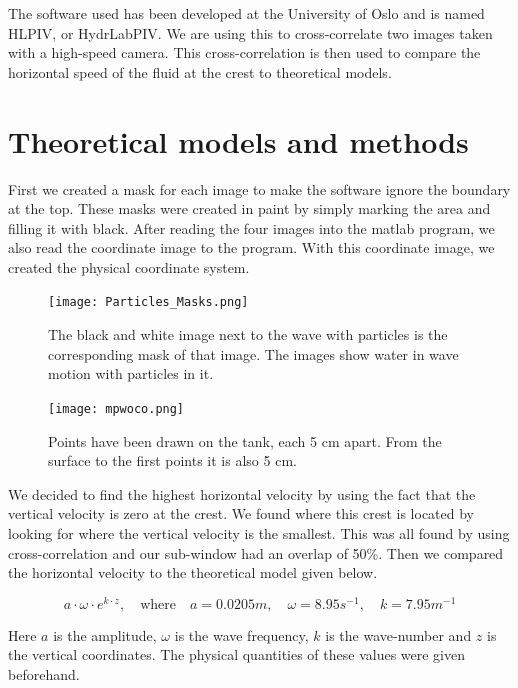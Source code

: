 \documentclass[english,a4paper,12pt]{article}
\begin{document}
The software used has been developed at the University of Oslo and is named HLPIV, or HydrLabPIV. We are using this to cross-correlate two images taken with a high-speed camera. This cross-correlation is then used to compare the horizontal speed of the fluid at the crest to theoretical models.

\section*{Theoretical models and methods}
First we created a mask for each image to make the software ignore the boundary at the top. These masks were created in paint by simply marking the area and filling it with black. After reading the four images into the matlab program, we also read the coordinate image to the program. With this coordinate image, we created the physical coordinate system.

\begin{figure}[H]
    \centering
    \texttt{[image: Particles\_Masks.png]}
    \caption{The black and white image next to the wave with particles is the corresponding mask of that image. The images show water in wave motion with particles in it.}
    \label{fig:1}
\end{figure}

\begin{figure}[H]
    \centering
    \texttt{[image: mpwoco.png]}
    \caption{Points have been drawn on the tank, each 5 cm apart. From the surface to the first points it is also 5 cm.}
    \label{fig:2}
\end{figure}

We decided to find the highest horizontal velocity by using the fact that the vertical velocity is zero at the crest. We found where this crest is located by looking for where the vertical velocity is the smallest. This was all found by using cross-correlation and our sub-window had an overlap of 50\%. Then we compared the horizontal velocity to the theoretical model given below.


\begin{equation} \label{eq:wave}
a\cdot \omega\cdot e^{k\cdot z}, \quad \text{where} \quad a = 0.0205m, \quad \omega = 8.95s^{-1}, \quad k = 7.95m^{-1}
\end{equation}

Here $a$ is the amplitude, $\omega$ is the wave frequency, $k$ is the wave-number and $z$ is the vertical coordinates. The physical quantities of these values were given beforehand. 
\end{document}
